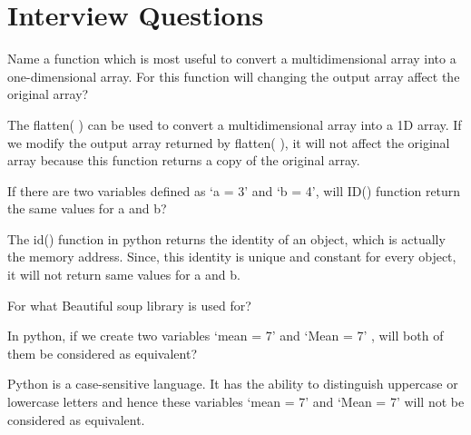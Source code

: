 	\chapter{Interview Questions}
	\resetquestioncounter{}
	\begin{qanda}
		\begin{question}
Name a function which is most useful to convert a multidimensional array into a one-dimensional array. For this function will changing the output array affect the original array?
		\end{question}
		\begin{answer}
The flatten( ) can be used to convert a multidimensional array into a 1D array. If we modify the output array returned by flatten( ), it will not affect the original array because this function returns a copy of the original array.
		\end{answer}
	\end{qanda}

	\begin{qanda}
		\begin{question}
 If there are two variables defined as `a = 3' and `b = 4', will ID() function return the same values for a and b?
		\end{question}
		\begin{answer}
The id() function in python returns the identity of an object, which is actually the memory address. Since, this identity is unique and constant for every object, it will not return same values for a and b.
		\end{answer}
	\end{qanda}

	\begin{qanda}
		\begin{question}
For what Beautiful soup library is used for?
		\end{question}
		\begin{answer}

		\end{answer}
	\end{qanda}

	\begin{qanda}
		\begin{question}
In python, if we create two variables `mean = 7' and `Mean = 7' , will both of them be considered as equivalent?
		\end{question}
		\begin{answer}
Python is a case-sensitive language.  It has the ability to distinguish uppercase or lowercase letters and hence these variables `mean = 7' and `Mean = 7' will not be considered as equivalent.
		\end{answer}
	\end{qanda}

